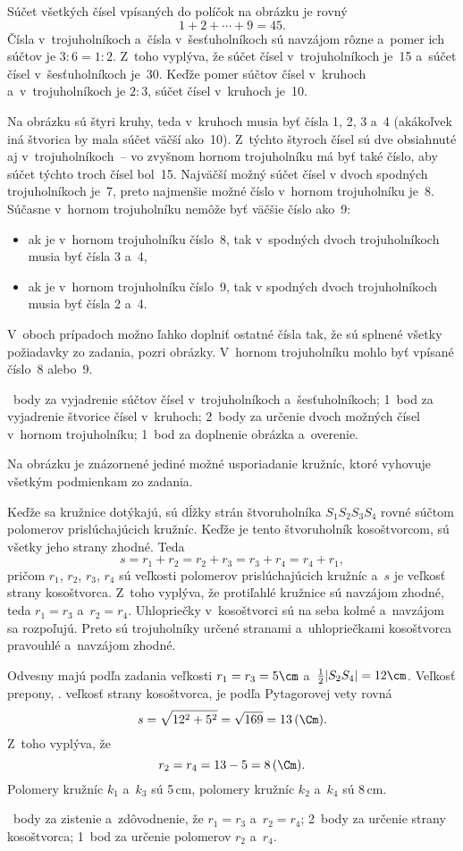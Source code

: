 {%
Súčet všetkých čísel vpísaných do políčok na obrázku je rovný
$$
1+2+\cdots+9=45.
$$
Čísla v~trojuholníkoch a~čísla v~šesťuholníkoch sú navzájom rôzne
a~pomer ich súčtov je $3:6=1:2$. Z~toho vyplýva, že súčet čísel
v~trojuholníkoch je~15 a~súčet čísel v~šesťuholníkoch je~30. Keďže
pomer súčtov čísel v~kruhoch a~v~trojuholníkoch je $2:3$, súčet čísel
v~kruhoch je~10.

Na obrázku sú štyri kruhy, teda v~kruhoch musia byť čísla 1, 2, 3 a~4
(akákoľvek iná štvorica by mala súčet väčší ako~10). Z~týchto štyroch
čísel sú dve obsiahnuté aj v~trojuholníkoch~-- vo zvyšnom hornom
trojuholníku má byť také číslo, aby súčet týchto troch čísel bol~15.
Najväčší možný súčet čísel v dvoch spodných trojuholníkoch je~7, preto
najmenšie možné číslo v~hornom trojuholníku je~8. Súčasne v~hornom
trojuholníku nemôže byť väčšie číslo ako~9:
\begin{itemize}
\item ak je v~hornom trojuholníku číslo~8, tak v~spodných dvoch trojuholníkoch musia byť čísla 3 a~4,
\item ak je v~hornom trojuholníku číslo~9, tak v spodných dvoch trojuholníkoch musia byť čísla 2 a~4.
\end{itemize}
V~oboch prípadoch možno ľahko doplniť ostatné čísla tak, že sú splnené
všetky požiadavky zo zadania, pozri obrázky.
V~hornom trojuholníku mohlo byť vpísané číslo~8 alebo~9.
%


~body za vyjadrenie súčtov čísel v~trojuholníkoch a~šesťuholníkoch;
1~bod za vyjadrenie štvorice čísel v~kruhoch;
2~body za určenie dvoch možných čísel v~hornom trojuholníku;
1~bod za doplnenie obrázka a~overenie.
\endhodnotenie
}

{%
Na obrázku je znázornené jediné možné usporiadanie kružníc, ktoré vyhovuje
všetkým podmienkam zo zadania.

Keďže sa kružnice dotýkajú, sú dĺžky strán štvoruholníka
$S_1S_2S_3S_4$ rovné súčtom polomerov prislúchajúcich kružníc. Keďže je
tento štvoruholník kosoštvorcom, sú všetky jeho strany zhodné. Teda
$$
s=r_1+r_2=r_2+r_3=r_3+r_4=r_4+r_1,
$$
pričom $r_1$, $r_2$, $r_3$, $r_4$ sú veľkosti polomerov prislúchajúcich
kružníc a~$s$ je veľkosť strany kosoštvorca. Z~toho vyplýva, že
protiľahlé kružnice sú navzájom zhodné, teda $r_1=r_3$ a~$r_2=r_4$.
Uhlopriečky v~kosoštvorci sú na seba kolmé a~navzájom sa rozpoľujú. Preto
sú trojuholníky určené stranami a~uhlopriečkami kosoštvorca pravouhlé
a~navzájom zhodné.
%


Odvesny majú podľa zadania veľkosti $r_1=r_3=5\cm$
a~$\frac12|S_2S_4|=12\cm$. Veľkosť prepony, \tj. veľkosť strany
kosoštvorca, je podľa Pytagorovej vety rovná
$$
s=\sqrt{12^2+5^2}=\sqrt{169}=13\,(\Cm).
$$
Z~toho vyplýva, že
$$
r_2=r_4=13-5=8\,(\Cm).
$$
Polomery kružníc $k_1$ a~$k_3$ sú 5\,cm, polomery kružníc $k_2$
a~$k_4$ sú 8\,cm.

~body za zistenie a~zdôvodnenie, že $r_1=r_3$ a~$r_2=r_4$;
2~body za určenie strany kosoštvorca;
1~bod za určenie polomerov $r_2$ a~$r_4$.
\endhodnotenie
}

